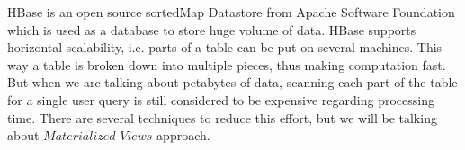 \documentclass[11pt,a4paper,bibtotoc,idxtotoc,headsepline,footsepline,footexclude,BCOR12mm,DIV13]{scrbook}
\begin{document}
HBase is an open source sortedMap Datastore from Apache Software Foundation which is used as a database to store huge volume of data. HBase supports horizontal scalability, i.e. parts of a table can be put on several machines. This way a table is broken down into multiple pieces, thus making computation fast. But when we are talking about petabytes of data, scanning each part of the table for a single user query is still considered to be expensive regarding processing time. There are several techniques to reduce this effort, but we will be talking about $Materialized$ $Views$ approach. 


\end{document}
